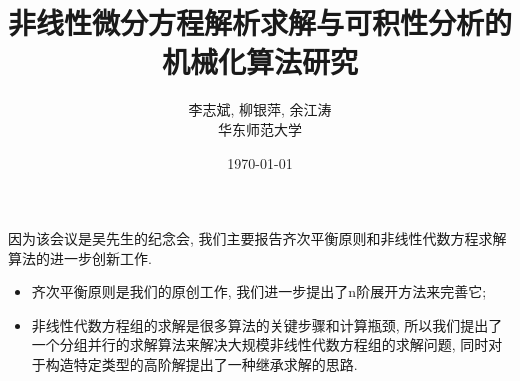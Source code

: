 \documentclass{beamer}
\title[]{非线性微分方程解析求解与可积性分析的机械化算法研究}
\author[]{李志斌, 柳银萍, 余江涛\\[1em] 华东师范大学}
\date{\today}
\begin{document}

\begin{frame}
    
\end{frame}

\begin{frame}
    
\end{frame}

\begin{frame}
    
\end{frame}

\begin{frame}
因为该会议是吴先生的纪念会, 我们主要报告齐次平衡原则和非线性代数方程求解算法的进一步创新工作. 
\begin{itemize}
\item 齐次平衡原则是我们的原创工作, 我们进一步提出了n阶展开方法来完善它; 
\item 非线性代数方程组的求解是很多算法的关键步骤和计算瓶颈, 所以我们提出了一个分组并行的求解算法来解决大规模非线性代数方程组的求解问题, 同时对于构造特定类型的高阶解提出了一种继承求解的思路. 
\end{itemize}

\end{frame}
\end{document}

